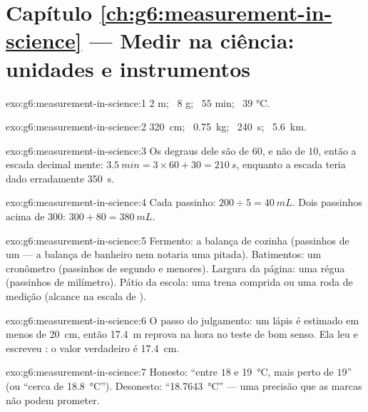\section*{Capítulo \ref{ch:g6:measurement-in-science} --- Medir na ciência: unidades e instrumentos}

\begin{solution}{exo:g6:measurement-in-science:1}
$2$ \unit{m}; \ $8$ \unit{g}; \ $55$ \unit{min}; \ $39$
\unit{\celsius}.
\end{solution}

\begin{solution}{exo:g6:measurement-in-science:2}
\qty{320}{cm}; \ \qty{0.75}{kg}; \ \qty{240}{s}; \ \qty{5.6}{km}.
\end{solution}

\begin{solution}{exo:g6:measurement-in-science:3}
Os degraus dele são de $60$, e não de $10$, então a escada decimal
mente: $\qty{3.5}{min} = 3 \times 60 + 30 = \qty{210}{s}$, enquanto a
escada teria dado erradamente \qty{350}{s}.
\end{solution}

\begin{solution}{exo:g6:measurement-in-science:4}
Cada passinho: $200 \div 5 = \qty{40}{mL}$. Dois passinhos acima de
$300$: $300 + 80 = \qty{380}{mL}$.
\end{solution}

\begin{solution}{exo:g6:measurement-in-science:5}
Fermento: a balança de cozinha (passinhos de um  --- a balança
de banheiro nem notaria uma pitada). Batimentos: um cronômetro
(passinhos de segundo e menores). Largura da página: uma régua
(passinhos de milímetro). Pátio da escola: uma trena comprida ou uma
roda de medição (alcance na escala de ).
\end{solution}

\begin{solution}{exo:g6:measurement-in-science:6}
O passo do julgamento: um lápis é estimado em menos de \qty{20}{cm},
então \qty{17.4}{m} reprova na hora no teste de bom senso. Ela leu
 e escreveu : o valor verdadeiro é \qty{17.4}{cm}.
\end{solution}

\begin{solution}{exo:g6:measurement-in-science:7}
Honesto: ``entre $18$ e \qty{19}{\celsius}, mais perto de $19$'' (ou
``cerca de \qty{18.8}{\celsius}''). Desonesto:
``\qty{18.7643}{\celsius}'' --- uma precisão que as marcas não podem
prometer.
\end{solution}

